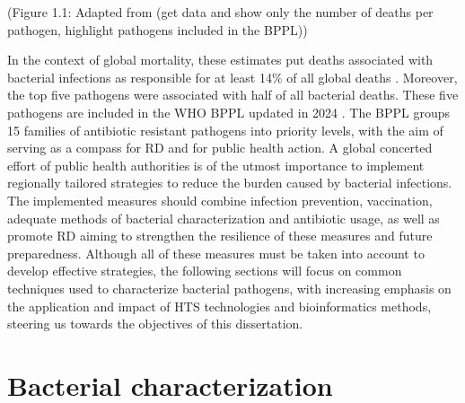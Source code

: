 (Figure 1.1: Adapted from \cite{ikuta_global_2022} (get data and show only the number of deaths per pathogen, highlight pathogens included in the \ac{BPPL}))

In the context of global mortality, these estimates put deaths associated with bacterial infections as responsible for at least 14\% of all global deaths \cite{ikuta_global_2022}. Moreover, the top five pathogens were associated with half of all bacterial deaths. These five pathogens are included in the \ac{WHO} \ac{BPPL} updated in 2024 \cite{noauthor_who_2024}. The \ac{BPPL} groups 15 families of antibiotic resistant pathogens into priority levels, with the aim of serving as a compass for \ac{RD} and for public health action. A global concerted effort of public health authorities is of the utmost importance to implement regionally tailored strategies to reduce the burden caused by bacterial infections. The implemented measures should combine infection prevention, vaccination, adequate methods of bacterial characterization and antibiotic usage, as well as promote \ac{RD} aiming to strengthen the resilience of these measures and future preparedness. Although all of these measures must be taken into account to develop effective strategies, the following sections will focus on common techniques used to characterize bacterial pathogens, with increasing emphasis on the application and impact of \ac{HTS} technologies and bioinformatics methods, steering us towards the objectives of this dissertation.

\section{Bacterial characterization}

